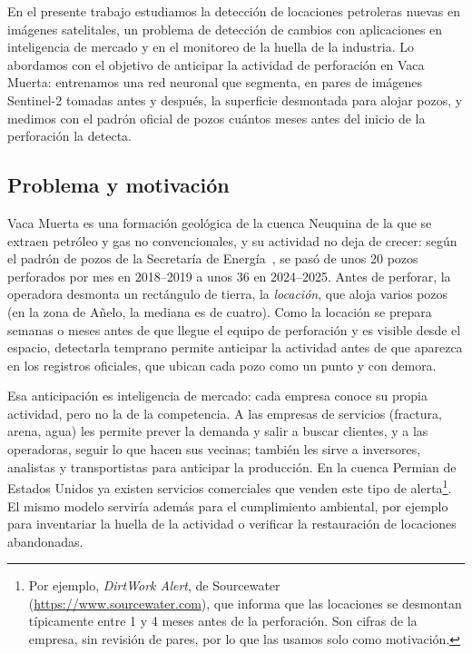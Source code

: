\documentclass[10pt,a4paper]{article}
\begin{document}
En el presente trabajo estudiamos la detección de locaciones petroleras nuevas en imágenes satelitales,
un problema de detección de cambios con aplicaciones en inteligencia de mercado y en el monitoreo de la huella
de la industria. Lo abordamos con el objetivo de anticipar la actividad de perforación en Vaca Muerta: entrenamos
una red neuronal que segmenta, en pares de imágenes Sentinel-2 tomadas antes y después, la superficie desmontada
para alojar pozos, y medimos con el padrón oficial de pozos cuántos meses antes del inicio de la perforación
la detecta.

\subsection{Problema y motivación}
Vaca Muerta es una formación geológica de la cuenca Neuquina de la que se extraen petróleo y gas no
convencionales, y su actividad no deja de crecer: según el padrón de pozos de la Secretaría de Energía~\cite{padron},
se pasó de unos 20 pozos perforados por mes en 2018--2019 a unos 36 en 2024--2025. Antes de perforar, la
operadora desmonta un rectángulo de tierra, la \emph{locación}, que aloja varios pozos (en la zona de Añelo, la
mediana es de cuatro). Como la locación se prepara semanas o meses antes de que llegue el equipo de perforación
y es visible desde el espacio, detectarla temprano permite anticipar la actividad antes de que aparezca en los
registros oficiales, que ubican cada pozo como un punto y con demora.

Esa anticipación es inteligencia de mercado: cada empresa conoce su propia actividad, pero no la de la
competencia. A las empresas de servicios (fractura, arena, agua) les permite prever la demanda y salir a buscar
clientes, y a las operadoras, seguir lo que hacen sus vecinas; también les sirve a inversores, analistas y
transportistas para anticipar la producción. En la cuenca Permian de Estados Unidos ya existen servicios
comerciales que venden este tipo de alerta\footnote{Por ejemplo, \emph{DirtWork Alert}, de Sourcewater
(\url{https://www.sourcewater.com}), que informa que las locaciones se desmontan típicamente entre 1 y 4 meses antes
de la perforación. Son cifras de la empresa, sin revisión de pares, por lo que las usamos solo como motivación.}.
El mismo modelo serviría además para el cumplimiento ambiental, por ejemplo para inventariar la huella de la
actividad o verificar la restauración de locaciones abandonadas.
\end{document}

